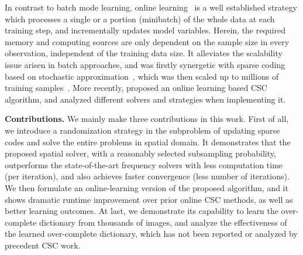 In contrast to batch mode learning, online learning~\cite{shalev2012online} is a well established strategy which processes a single or a portion (minibatch) of the whole data at each training step, and incrementally updates model variables. Herein, the required memory and computing sources are only dependent on the sample size in every observation, independent of the training data size. It alleviates the scalability issue arisen in batch approaches, and was firstly synergetic with sparse coding based on stochastic approximation~\cite{bousquet2008tradeoffs}, which was then scaled up to millions of training samples~\cite{mairal2009online,mairal2010online}. More recently, \cite{liu-2018-first} proposed an online learning based CSC algorithm, and analyzed different solvers and strategies when implementing it.

{\bfseries Contributions.} We mainly make three contributions in this work. First of all, we introduce a randomization strategy in the subproblem of updating sparse codes and solve the entire problems in spatial domain. It demonstrates that the proposed spatial solver, with a reasonably selected subsampling probability, outperforms the state-of-the-art frequency solvers with less computation time (per iteration), and also achieves faster convergence (less number of iterations). We then formulate an online-learning version of the proposed algorithm, and it shows dramatic runtime improvement over prior online CSC methods, as well as better learning outcomes. At last, we demonstrate its capability to learn the over-complete dictionary from thousands of images, and analyze the effectiveness of the learned over-complete dictionary, which has not been reported or analyzed by precedent CSC work.
